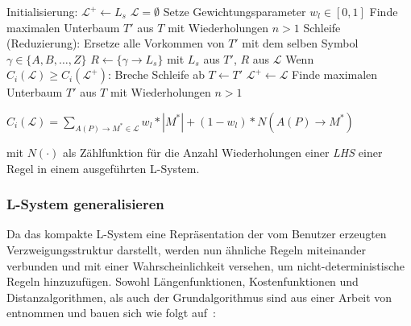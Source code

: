\begin{algorithm}[caption={Erstellen eines kompakten L-Systems mit Gewichtung $w_l$}, label={alg3}]
Initialisierung:
    $\mathcal{L}^+ \leftarrow L_s$
    $\mathcal{L}=\emptyset$
    Setze Gewichtungsparameter $w_l \in [0,1]$
    Finde maximalen Unterbaum $T'$ aus $T$ mit Wiederholungen $n>1$
Schleife (Reduzierung):
    Ersetze alle Vorkommen von $T'$ mit dem selben Symbol $\gamma \in \{A,B,\dots,Z\}$
    $R \leftarrow \{\gamma \rightarrow L_s\}$ mit $L_s$ aus $T'$, $R$ aus $\mathcal{L}$
    Wenn $C_i(\mathcal{L}) \geq C_i(\mathcal{L}^+)$:
        Breche Schleife ab
    $T \leftarrow T'$
    $\mathcal{L}^+ \leftarrow \mathcal{L}$
    Finde maximalen Unterbaum $T'$ aus $T$ mit Wiederholungen $n>1$
\end{algorithm}

\begin{algorithm}[caption={Kostenfunktion $C_i$ mit Gewichtung $w_l$}, label={alg4}]
$C_i(\mathcal{L})= \sum\limits_{A(P) \rightarrow M^* \in \mathcal{L}} w_l * |M^*| + (1 - w_l) * N(A(P)\rightarrow M^*)$
\end{algorithm}
mit $N(\cdot)$ als Zählfunktion für die Anzahl Wiederholungen einer \textit{LHS} einer Regel in einem
ausgeführten L-System.

\subsubsection*{L-System generalisieren}
Da das kompakte L-System eine Repräsentation der vom Benutzer erzeugten Verzweigungsstruktur darstellt, werden
nun ähnliche Regeln miteinander verbunden und mit einer Wahrscheinlichkeit versehen, um nicht-deterministische
Regeln hinzuzufügen.
Sowohl Längenfunktionen, Kostenfunktionen und Distanzalgorithmen, als auch der Grundalgorithmus sind aus einer Arbeit
von~\citeauthor{guo_2020} entnommen und bauen sich wie folgt auf~\cite{guo_2020}:

